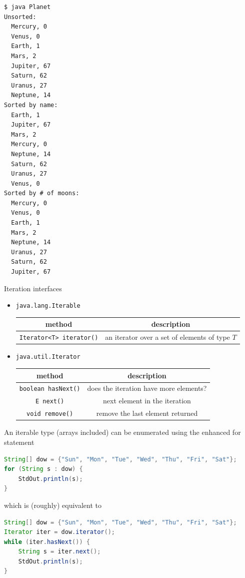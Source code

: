 \documentclass[8pt,a4paper,compress]{beamer}
\begin{document}
\begin{frame}[fragile]
\pause

\begin{lstlisting}[language={}]
$ java Planet
Unsorted:
  Mercury, 0
  Venus, 0
  Earth, 1
  Mars, 2
  Jupiter, 67
  Saturn, 62
  Uranus, 27
  Neptune, 14
Sorted by name:
  Earth, 1
  Jupiter, 67
  Mars, 2
  Mercury, 0
  Neptune, 14
  Saturn, 62
  Uranus, 27
  Venus, 0
Sorted by # of moons:
  Mercury, 0
  Venus, 0
  Earth, 1
  Mars, 2
  Neptune, 14
  Uranus, 27
  Saturn, 62
  Jupiter, 67
\end{lstlisting}
\end{frame}

\begin{frame}[fragile]
\pause

Iteration interfaces 
\begin{itemize}
\item \lstinline{java.lang.Iterable}
\begin{center}
\begin{tabular}{cc}
method & description \\ \hline
\lstinline$Iterator<T> iterator()$ & an iterator over a set of elements of type $T$
\end{tabular} 
\end{center}

\item \lstinline{java.util.Iterator}
\begin{center}
\begin{tabular}{cc}
method & description \\ \hline
\lstinline$boolean hasNext()$ & does the iteration have more elements? \\
\lstinline$E next()$ & next element in the iteration \\
\lstinline$void remove()$ & remove the last element returned
\end{tabular} 
\end{center}
\end{itemize}

\pause
\bigskip

An iterable type (arrays included) can be enumerated using the enhanced for statement
\begin{lstlisting}[language=Java]
String[] dow = {"Sun", "Mon", "Tue", "Wed", "Thu", "Fri", "Sat"};
for (String s : dow) {
    StdOut.println(s);
}
\end{lstlisting}
which is (roughly) equivalent to
\begin{lstlisting}[language=Java]
String[] dow = {"Sun", "Mon", "Tue", "Wed", "Thu", "Fri", "Sat"};
Iterator iter = dow.iterator();
while (iter.hasNext()) {
    String s = iter.next();
    StdOut.println(s);
}
\end{lstlisting}
\end{frame}
\end{document}

